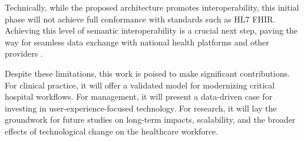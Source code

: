 Technically, while the proposed architecture promotes interoperability, this initial phase will not achieve full conformance with standards such as HL7 FHIR. Achieving this level of semantic interoperability is a crucial next step, paving the way for seamless data exchange with national health platforms and other providers \cite{mandl2020}.

Despite these limitations, this work is poised to make significant contributions. For clinical practice, it will offer a validated model for modernizing critical hospital workflows. For management, it will present a data-driven case for investing in user-experience-focused technology. For research, it will lay the groundwork for future studies on long-term impacts, scalability, and the broader effects of technological change on the healthcare workforce. 